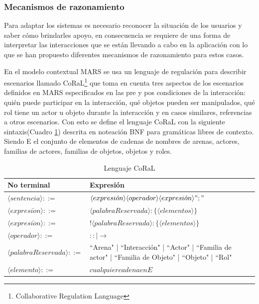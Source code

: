 {\subsubsection{Mecanismos de razonamiento}

Para adaptar los sistemas es necesario reconocer la situaci\'on de los usuarios y saber c\'omo brindarles apoyo, en consecuencia se requiere de una forma de interpretar las interacciones que se est\'an llevando a cabo en la aplicaci\'on con lo que se han propuesto diferentes mecanismos de razonamiento para estos casos.

En el modelo contextual MARS se usa un lenguaje de regulaci\'on para describir escenarios llamado CoRaL\footnote{Collaborative Regulation Language} que toma en cuenta tres aspectos de los escenarios definidos en MARS especificados en las pre y pos condiciones de la interacci\'on: qui\'en puede participar en la interacci\'on, qu\'e objetos pueden ser manipulados, qu\'e rol tiene un actor u objeto durante la interacci\'on y en casos similares, referencias a otros escenarios. Con esto se define el lenguaje CoRaL con la siguiente sintaxis(Cuadro \ref{lan:mars}) descrita en noteaci\'on BNF para gram\'aticas libres de contexto. Siendo E el conjunto de elementos de cadenas de nombres de arenas, actores, familias de actores, familias de objetos, objetos y roles. 

\begin{table}
\label{lan:mars}
\centering
\caption{Lenguaje CoRaL}
\begin{tabular}{|p{5cm}|p{8cm}|}
\hline \textbf{No terminal} & \textbf{Expresi\'on}\\
\hline $\langle sentencia \rangle ::=$ & $\langle expresi\acute{o}n \rangle \langle operador \rangle \langle expresi\acute{o}n \rangle";"$\\
\hline $\langle expresi\acute{o}n \rangle  ::=$ & $\langle palabraReservada \rangle :\{\langle elementos \rangle \}$\\
\hline
$\langle expresi\acute{o}n \rangle  ::=$ & $!\langle palabraReservada \rangle :\{\langle elementos \rangle \}$\\
\hline $\langle operador \rangle  ::=$ & $:: | \rightarrow$\\
\hline $\langle palabraReservada \rangle  ::=$ &  ``Arena" | ``Interacci\'on" | ``Actor" | ``Familia de actor" | ``Familia de Objeto" | ``Objeto" | ``Rol"\\
\hline $\langle elemento \rangle  ::=$ & $cualquier cadena en E$ \\
\hline
\end{tabular}
\end{table}

}
